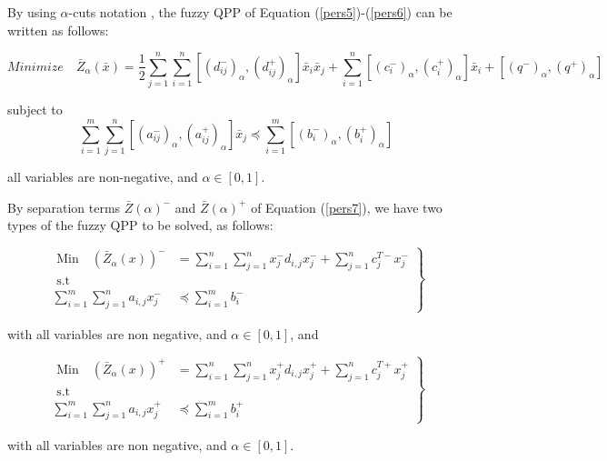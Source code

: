 \documentclass{iaesarticle3}
\begin{document}
By using $\alpha$-cuts notation \cite{kau}, the fuzzy QPP of Equation (\ref{pers5})-(\ref{pers6}) can be written as follows:

\begin{equation}\label{pers7}
    Minimize \quad \bar{Z}_\alpha(\bar{x}) = \frac{1}{2} \sum_{j=1}^n \sum_{i=1}^n [(d_{ij}^-)_\alpha,  (d_{ij}^+)_\alpha]\bar{x}_i \bar{x}_j + \sum_{i=1}^n [(c_i^-)_\alpha, (c_i^+)_\alpha] \bar{x}_i + [(q^-)_\alpha, (q^+)_\alpha]
\end{equation}

\noindent subject to
\begin{equation}\label{pers8}
    \sum_{i=1}^m \sum_{j=1}^n [(a_{ij}^-)_\alpha, (a_{ij}^+)_\alpha] \bar{x}_j \preceq \sum_{i=1}^m [(b_i^-)_\alpha, (b_i^+)_\alpha]
\end{equation}

\noindent all variables are non-negative, and $\alpha \in [0,1]$.

By separation terms $\bar Z(\alpha)^-$ and $\bar Z(\alpha)^+$ of Equation (\ref{pers7}), we have two types of the fuzzy QPP to be solved, as follows:

\begin{equation}\label{pers5a}
 \left.\begin{aligned}
        \text{ Min} \quad (\bar Z_\alpha(x))^- &= \sum_{i=1}^n\sum_{j=1}^n x_j^- d_{i,j} x_j^- + \sum_{j=1}^n c_j^{T-}x_j^- \\
        \text{ s.t } \qquad \quad \quad \qquad & \\
        \sum_{i=1}^m\sum_{j=1}^n a_{i,j}x_j^- &\preceq \sum_{i=1}^m b_i^-
       \end{aligned}
 \right \}
\end{equation}

\noindent with all variables are non negative, and $\alpha \in [0,1]$, and

\begin{equation}\label{pers5b}
 \left.\begin{aligned}
        \text{ Min} \quad (\bar Z_\alpha(x))^+ &= \sum_{i=1}^n\sum_{j=1}^n x_j^+ d_{i,j} x_j^+ + \sum_{j=1}^n c_j^{T+}x_j^+ \\
        \text{ s.t } \qquad \quad \quad \qquad & \\
        \sum_{i=1}^m\sum_{j=1}^n a_{i,j}x_j^+ &\preceq \sum_{i=1}^m b_i^+
       \end{aligned}
 \right \}
\end{equation}

\noindent with all variables are non negative, and $\alpha \in [0,1]$.
\end{document}
